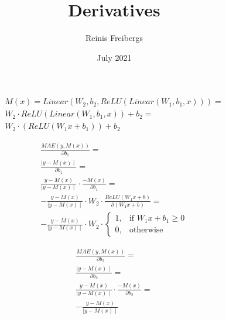 \documentclass{article}
\title{Derivatives}
\author{Reinis Freibergs}
\date{July 2021}
\begin{document}
\maketitle


\begin{equation*}
\begin{aligned}
    M(x) = Linear(W_2,b_2, ReLU( Linear(W_1,b_1,x)))=\\
    W_2\cdot ReLU(Linear(W_1,b_1,x))+b_2 =\\
    W_2\cdot (ReLU(W_1x + b_1))+b_2
\end{aligned}
\end{equation*}


\bigskip

\begin{equation*}
\begin{aligned}
    \frac{MAE(y, M(x))}{\partial b_1} = \\
    \frac{\mid y - M(x) \mid}{\partial b_1} = \\
    \frac{y - M(x)}{\mid y - M(x) \mid}\cdot \frac{-M(x)}{\partial b_1} = \\
    -\frac{y - M(x)}{\mid y - M(x)\mid}\cdot W_2\cdot \frac{ ReLU(W_1x + b ) }{\partial (W_1x + b)} = \\
    -\frac{y - M(x)}{\mid y - M(x)\mid}\cdot W_2\cdot\begin{cases}
        1, & \text{if $W_1x + b_1\geq0$}\\
        0, & \text{otherwise}
        \end{cases}
\end{aligned}
\end{equation*}

\bigskip

\begin{equation*}
\begin{aligned}
    \frac{MAE(y, M(x))}{\partial b_2} =  \\
    \frac{\mid y - M(x) \mid}{\partial b_2} = \\
    \frac{y - M(x)}{\mid y - M(x) \mid}\cdot \frac{-M(x)}{\partial b_2} =  \\
    -\frac{y - M(x)}{\mid y - M(x) \mid}
\end{aligned}
\end{equation*}
\end{document}
